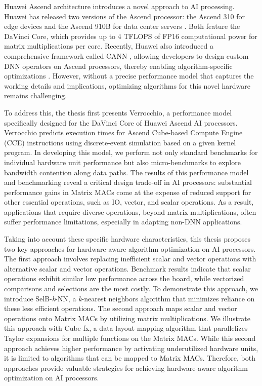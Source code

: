 Huawei Ascend architecture \cite{DBLP:conf/hotchips/LiaoTXZ19} introduces a novel approach to AI processing. Huawei has released two versions of the Ascend processor: the Ascend 310 for edge devices \cite{DBLP:conf/hotchips/LiaoTXZ19} and the Ascend 910B for data center servers \cite{910}. Both feature the DaVinci Core, which provides up to 4 TFLOPS of FP16 computational power for matrix multiplications per core. Recently, Huawei also introduced a comprehensive framework called CANN \cite{CANN}, allowing developers to design custom DNN operators on Ascend processors, thereby enabling algorithm-specific optimizations \cite{DBLP:conf/ipps/RohwedderCAACW21, DBLP:conf/icpp/JiW21}. However, without a precise performance model that captures the working details and implications, optimizing algorithms for this novel hardware remains challenging.

To address this, the thesis first presents Verrocchio, a performance model specifically designed for the DaVinci Core of Huawei Ascend AI processors. Verrocchio predicts execution times for Ascend Cube-based Compute Engine (CCE) instructions using discrete-event simulation based on a given kernel program. In developing this model, we perform not only standard benchmarks for individual hardware unit performance but also micro-benchmarks to explore bandwidth contention along data paths. The results of this performance model and benchmarking reveal a critical design trade-off in AI processors: substantial performance gains in Matrix MACs come at the expense of reduced support for other essential operations, such as IO, vector, and scalar operations. As a result, applications that require diverse operations, beyond matrix multiplications, often suffer performance limitations, especially in adapting non-DNN applications.

Taking into account these specific hardware characteristics, this thesis proposes two key approaches for hardware-aware algorithm optimization on AI processors. The first approach involves replacing inefficient scalar and vector operations with alternative scalar and vector operations. Benchmark results indicate that scalar operations exhibit similar low performance across the board, while vectorized comparisons and selections are the most costly. To demonstrate this approach, we introduce SelB-\textit{k}-NN, a \textit{k}-nearest neighbors algorithm that minimizes reliance on these less efficient operations. The second approach maps scalar and vector operations onto Matrix MACs by utilizing matrix multiplications. We illustrate this approach with Cube-fx, a data layout mapping algorithm that parallelizes Taylor expansions for multiple functions on the Matrix MACs. While this second approach achieves higher performance by activating underutilized hardware units, it is limited to algorithms that can be mapped to Matrix MACs. Therefore, both approaches provide valuable strategies for achieving hardware-aware algorithm optimization on AI processors.

